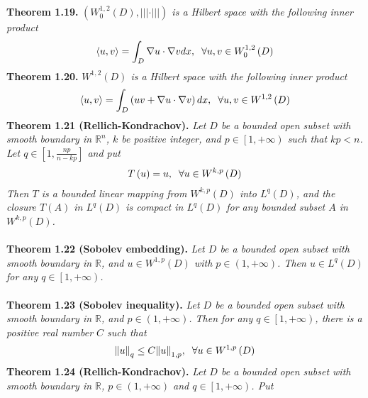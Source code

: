\documentclass[a4paper]{article}
\numberwithin{equation}{section}
\begin{document}
\textbf{Theorem 1.19.} \textit{$\left( {W_0^{1,2}\left( D \right),||| \cdot |||} \right)$ is a Hilbert space with the following inner product}
\begin{align}
\left\langle {u,v} \right\rangle  = \int_D {\nabla u \cdot \nabla vdx} ,\hspace{0.2cm}\forall u,v \in W_0^{1,2}\left( D \right)
\end{align}
\textbf{Theorem 1.20.} \textit{${W^{1,2}}\left( D \right)$ is a Hilbert space with the following inner product}
\begin{align}
\left\langle {u,v} \right\rangle  = \int_D {\left( {uv + \nabla u \cdot \nabla v} \right)dx} ,\hspace{0.2cm}\forall u,v \in {W^{1,2}}\left( D \right)
\end{align}
\textbf{Theorem 1.21 (Rellich-Kondrachov).} \textit{Let $D$ be a bounded open subset with smooth boundary in $\mathbb{R}^n$, $k$ be positive integer, and $p\in \left[1,+\infty \right)$ such that $kp<n$. Let $q \in \left[ {1,\frac{{np}}{{n - kp}}} \right]$ and put}
\begin{align}
T\left( u \right) = u,\hspace{0.2cm}\forall u \in {W^{k,p}}\left( D \right)
\end{align}
\textit{Then $T$ is a bounded linear mapping from $W^{k,p}\left(D\right)$ into $L^q\left(D\right)$, and the closure $T\left(A\right)$ in $L^q\left(D\right)$ is compact in $L^q\left(D\right)$ for any bounded subset $A$ in $W^{k,p}\left(D\right)$.}\\
\\
\textbf{Theorem 1.22 (Sobolev embedding).} \textit{Let $D$ be a bounded open subset with smooth boundary in $\mathbb{R}$, and $u \in W^{1,p}\left(D\right)$ with $p\in \left(1,+\infty\right)$. Then $u \in L^q\left(D\right)$ for any $q\in \left[1,+\infty \right)$.}\\
\\
\textbf{Theorem 1.23 (Sobolev inequality).} \textit{Let $D$ be a bounded open subset with smooth boundary in $\mathbb{R}$, and $p\in \left(1,+\infty\right)$. Then for any $q\in \left[1,+\infty\right)$, there is a positive real number $C$ such that}
\begin{align}
{\left\| u \right\|_q} \le C{\left\| u \right\|_{1,p}},\hspace{0.2cm} \forall u \in {W^{1,p}}\left( D \right)
\end{align}
\textbf{Theorem 1.24 (Rellich-Kondrachov).} \textit{Let $D$ be a bounded open subset with smooth boundary in $\mathbb{R}$, $p\in \left(1,+\infty\right)$ and $q\in \left[1,+\infty\right)$. Put}
\end{document}
